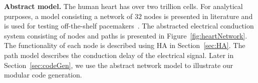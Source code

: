 \noindent \textbf{Abstract model.}
The human heart has over two trillion cells. For analytical purposes, a
model consisting  a network of  $32$ nodes is presented in literature
and is used for testing off-the-shelf pacemakers~\cite{chen14,zhihao12}.
The abstracted electrical conduction system consisting  of 
nodes and paths is presented in Figure~\ref{fig:heartNetwork}.
The functionality of each node is described using \acf{HA} in Section~\ref{sec:HA}. The path model describes the 
conduction delay of the electrical signal.
Later in Section~\ref{sec:codeGen}, we use the abstract network model 
to illustrate our modular code generation.

 
